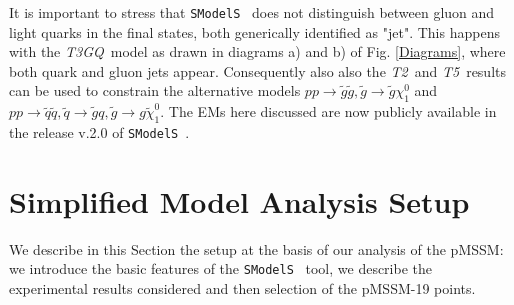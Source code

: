\documentclass[a4paper,11pt]{article}
\newcommand{\MET}{{ $E_T ^{miss}$}}
\newcommand{\SMO}{\texttt{SModelS\xspace}}
\newcommand{\TGQ}{ \textit{T3GQ}}
\newcommand{\Ttwo}{ \textit{T2}}
\newcommand{\Tfive}{ \textit{T5}}
\begin{document}
%
%
%
It is important to stress that \SMO~ does not distinguish between gluon and light quarks in the final states, both generically identified as "jet". This happens with the \TGQ~model as drawn in diagrams a) and b) of Fig. \ref{Diagrams}, where both quark and gluon jets appear. Consequently also also the \Ttwo~and\Tfive~results can be used to constrain the alternative models $p p \rightarrow \tilde g \tilde g ,\tilde g \rightarrow \tilde g \chi _1 ^0$ and $p p \rightarrow \tilde q \tilde q ,\tilde q \rightarrow \tilde g q, \tilde g \rightarrow g \tilde \chi _1 ^0$.
The EMs here discussed are now publicly available in the release v.2.0 of \SMO~.  
%
\section{Simplified Model Analysis Setup}\label{sec::setup}
%
We describe in this Section the setup at the basis of our analysis of the pMSSM: we introduce the basic features of the \SMO~ tool, we describe the experimental results considered and then selection of the pMSSM-19 points. 
\end{document}
